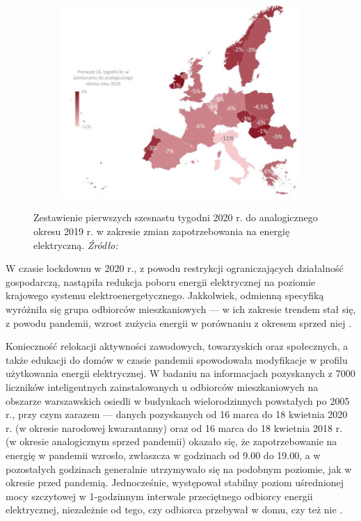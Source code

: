 \documentclass[polish, twoside, 12pt, a4paper]{article}
\theoremstyle{definition}
\theoremstyle{plain}
\theoremstyle{remark}
\begin{document}
\begin{figure}[hbt]
  \centering

  \begin{subfigure}[t]{0.45\textwidth}
    \hspace{-1.8cm}
    \includegraphics[width=1.4\textwidth]{./out_figures/figure_6}
  \end{subfigure}

  \captionsetup{margin=10pt,font=small,labelfont=bf,width=.8\textwidth}

  \caption[Zmiany zapotrzebowania na energię elektryczną (16 tygodni)]{Zestawienie pierwszych szesnastu tygodni 2020 r. do analogicznego okresu 2019 r. w zakresie zmian zapotrzebowania na energię elektryczną. \textit{Źródło:} \cite{biuroanalizpfr2020}}\label{fig:x6}
\end{figure}

W czasie lockdownu w 2020 r., z powodu restrykcji ograniczających działalność gospodarczą, nastąpiła redukcja poboru energii elektrycznej na poziomie krajowego systemu elektroenergetycznego. Jakkolwiek, odmienną specyfiką wyróżniła się grupa odbiorców mieszkaniowych --- w ich zakresie trendem stał się, z powodu pandemii, wzrost zużycia energii w porównaniu z okresem sprzed niej \parencite{artsmart2023}. 

Konieczność relokacji aktywności zawodowych, towarzyskich oraz społecznych, a także edukacji do domów w czasie pandemii spowodowała modyfikacje w profilu użytkowania energii elektrycznej. W badaniu na informacjach pozyskanych z 7000 liczników inteligentnych zainstalowanych u odbiorców mieszkaniowych na obszarze warszawskich osiedli w budynkach wielorodzinnych powstałych po 2005 r., przy czym zarazem --- danych pozyskanych od 16 marca do 18 kwietnia 2020 r. (w okresie narodowej kwarantanny) oraz od 16 marca do 18 kwietnia 2018 r. (w okresie analogicznym sprzed pandemii) okazało się, że zapotrzebowanie na energię w pandemii wzrosło, zwłaszcza w godzinach od 9.00 do 19.00, a w pozostałych godzinach generalnie utrzymywało się na podobnym poziomie, jak w okresie przed pandemią. Jednocześnie, występował stabilny poziom uśrednionej mocy szczytowej w 1-godzinnym interwale przeciętnego odbiorcy energii elektrycznej, niezależnie od tego, czy odbiorca przebywał w domu, czy też nie \parencite{artsmart2023}. 
\end{document}
